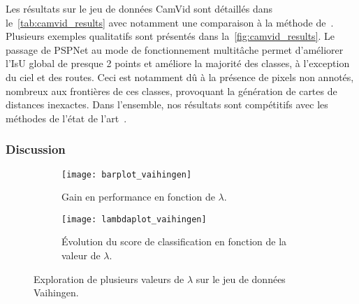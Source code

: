 Les résultats sur le jeu de données CamVid sont détaillés dans le~\cref{tab:camvid_results} avec notamment une comparaison à la méthode de~\citet{jegou_one_2017}. Plusieurs exemples qualitatifs sont présentés dans la~\cref{fig:camvid_results}. Le passage de PSPNet au mode de fonctionnement multitâche permet d'améliorer l'\gls{IsU} global de presque 2 points et améliore la majorité des classes, à l'exception du ciel et des routes. Ceci est notamment dû à la présence de pixels non annotés, nombreux aux frontières de ces classes, provoquant la génération de cartes de distances inexactes. Dans l'ensemble, nos résultats sont compétitifs avec les méthodes de l'état de l'art~\cite{jegou_one_2017,chen_deeplab_2018}.

\subsubsection{Discussion}


\begin{figure}[!t]
	\captionsetup[subfigure]{position=b}
	\begin{subfigure}{0.49\linewidth}
    \texttt{[image: barplot\_vaihingen]}
    \caption{Gain en performance en fonction de $\lambda$.}
    \end{subfigure}
    \hfill
    \begin{subfigure}{0.49\linewidth}
    \texttt{[image: lambdaplot\_vaihingen]}
    \caption{Évolution du score de classification en fonction de la valeur de $\lambda$.}
    \end{subfigure}
    \caption{Exploration de plusieurs valeurs de $\lambda$ sur le jeu de données  Vaihingen.}
    \label{fig:lambda_space}
\end{figure}

